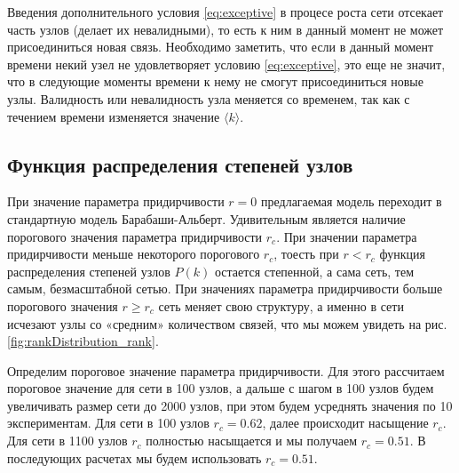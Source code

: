 \documentclass[10pt,aps,pra]{revtex4-1}
\begin{document}
Введения дополнительного условия \eqref{eq:exceptive} в процесе роста сети отсекает часть узлов (делает их невалидными), то есть к ним в данный момент не может присоединиться новая связь. Необходимо заметить, что если в данный момент времени некий узел не удовлетворяет условию \eqref{eq:exceptive}, это еще не значит, что в следующие моменты времени к нему не смогут присоединиться новые узлы. Валидность или невалидность узла меняется со временем, так как с течением времени изменяется значение $\langle k \rangle$.

\subsection{Функция распределения степеней узлов}
При значение параметра придирчивости $r=0$ предлагаемая модель переходит в стандартную модель Барабаши-Альберт. Удивительным является наличие порогового значения параметра придирчивости $r_c$. При значении параметра придирчивости меньше некоторого порогового $r_c$, тоесть при $r<r_c$ функция распределения степеней узлов $P(k)$ остается степенной, а сама сеть, тем самым, безмасштабной сетью. При значениях параметра придирчивости больше порогового значения $r \geq r_c$ сеть меняет свою структуру, а именно в сети исчезают узлы со «средним» количеством связей, что мы можем увидеть на рис. \ref{fig:rankDistribution_rank}. 

Определим пороговое значение параметра придирчивости. Для этого рассчитаем пороговое значение для сети в 100 узлов, а дальше с шагом в 100 узлов будем увеличивать размер сети до 2000 узлов, при этом будем усреднять значения по 10 экспериментам. Для сети в 100 узлов $r_c=0.62$, далее происходит насыщение $r_c$. Для сети в 1100 узлов $r_c$ полностью насыщается и мы получаем $r_c=0.51$. В последующих расчетах мы будем использовать $r_c=0.51$.
\end{document}
